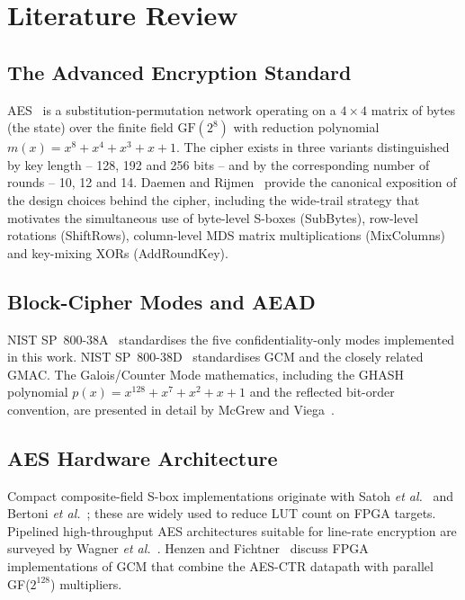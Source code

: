 \documentclass[conference,10pt,a4paper]{IEEEtran}
\begin{document}
\section{Literature Review}
\label{sec:litrev}

\subsection{The Advanced Encryption Standard}
AES~\cite{fips197} is a substitution-permutation network operating on a
$4\times4$ matrix of bytes (the state) over the finite field
$\mathrm{GF}(2^8)$ with reduction polynomial
$m(x) = x^8 + x^4 + x^3 + x + 1$.  The cipher exists in three variants
distinguished by key length -- 128, 192 and 256 bits -- and by the
corresponding number of rounds -- 10, 12 and 14.  Daemen and
Rijmen~\cite{daemenrijmen} provide the canonical exposition of the design
choices behind the cipher, including the wide-trail strategy that motivates
the simultaneous use of byte-level S-boxes (SubBytes), row-level rotations
(ShiftRows), column-level MDS matrix multiplications (MixColumns) and
key-mixing XORs (AddRoundKey).

\subsection{Block-Cipher Modes and AEAD}
NIST SP~800-38A~\cite{sp80038a} standardises the five confidentiality-only
modes implemented in this work.  NIST SP~800-38D~\cite{sp80038d}
standardises GCM and the closely related GMAC.  The Galois/Counter Mode
mathematics, including the GHASH polynomial $p(x) = x^{128} + x^7 + x^2 +
x + 1$ and the reflected bit-order convention, are presented in detail by
McGrew and Viega~\cite{mcgrew-viega}.

\subsection{AES Hardware Architecture}
Compact composite-field S-box implementations originate with
Satoh \emph{et al.}~\cite{satoh} and Bertoni \emph{et al.}~\cite{bertoni};
these are widely used to reduce LUT count on FPGA targets.  Pipelined
high-throughput AES architectures suitable for line-rate encryption are
surveyed by Wagner \emph{et al.}~\cite{wagner-pipelined}.  Henzen and
Fichtner~\cite{henzen-gcm} discuss FPGA implementations of GCM that
combine the AES-CTR datapath with parallel GF($2^{128}$) multipliers.
\end{document}
